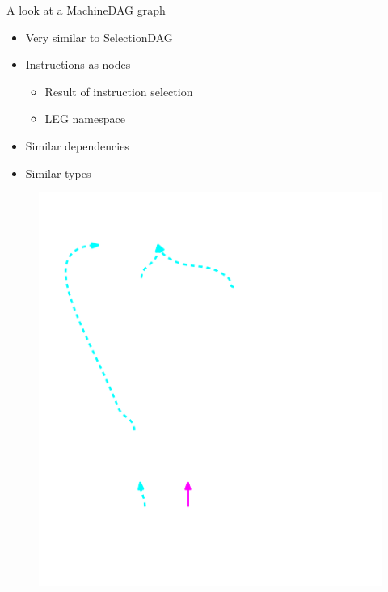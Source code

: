 
\begin{frame}{A look at a MachineDAG graph}

\begin{minipage}[t]{0.50\linewidth}
    \begin{itemize}
        \item Very similar to SelectionDAG
        \item Instructions as nodes
        \begin{itemize}
            \item Result of instruction selection
            \item LEG namespace
        \end{itemize}
        \item Similar dependencies
        \item Similar types
    \end{itemize}
\end{minipage}
\begin{minipage}[t]{0.49\linewidth}
    \begin{figure}
        \vspace{-2.2ex}
        \includegraphics[width = 1.00\textwidth]{examples/ex1b/ex1b-post-isel.pdf}
    \end{figure}
\end{minipage}

\end{frame}

